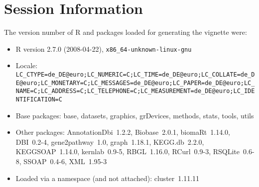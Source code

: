 \documentclass[11pt,a4paper]{article}
\begin{document}



\section*{Session Information}

The version number of R and packages loaded for generating the vignette were:


\begin{itemize}
  \item R version 2.7.0 (2008-04-22), \verb|x86_64-unknown-linux-gnu|
  \item Locale: \verb|LC_CTYPE=de_DE@euro;LC_NUMERIC=C;LC_TIME=de_DE@euro;LC_COLLATE=de_DE@euro;LC_MONETARY=C;LC_MESSAGES=de_DE@euro;LC_PAPER=de_DE@euro;LC_NAME=C;LC_ADDRESS=C;LC_TELEPHONE=C;LC_MEASUREMENT=de_DE@euro;LC_IDENTIFICATION=C|
  \item Base packages: base, datasets, graphics, grDevices, methods,
    stats, tools, utils
  \item Other packages: AnnotationDbi~1.2.2, Biobase~2.0.1,
    biomaRt~1.14.0, DBI~0.2-4, gene2pathway~1.0, graph~1.18.1,
    KEGG.db~2.2.0, KEGGSOAP~1.14.0, kernlab~0.9-5, RBGL~1.16.0,
    RCurl~0.9-3, RSQLite~0.6-8, SSOAP~0.4-6, XML~1.95-3
  \item Loaded via a namespace (and not attached): cluster~1.11.11
\end{itemize}
\end{document}
